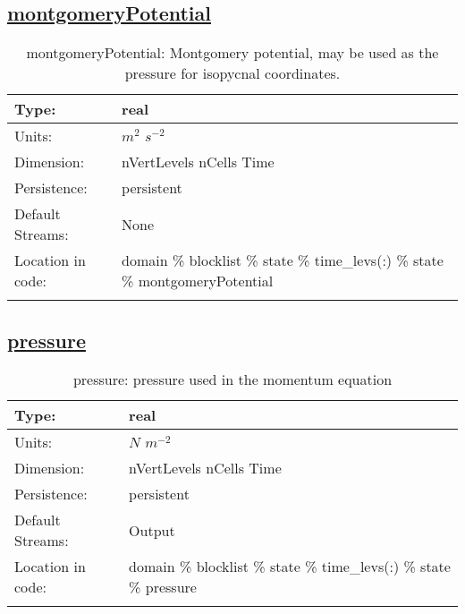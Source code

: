 \subsection[montgomeryPotential]{\hyperref[sec:var_tab_state]{montgomeryPotential}}
\label{subsec:var_sec_state_montgomeryPotential}
\begin{center}
\begin{longtable}{| p{2.0in} | p{4.0in} |}
        \hline 
        Type: & real \\
        \hline 
        Units: & $m^2$ $s^{-2}$ \\
        \hline 
        Dimension: & nVertLevels nCells Time \\
        \hline 
        Persistence: & persistent \\
        \hline 
		 Default Streams: & None \\
        \hline 
		 Location in code: & domain \% blocklist \% state \% time\_levs(:) \% state \% montgomeryPotential \\
		 \hline 
    \caption{montgomeryPotential: Montgomery potential, may be used as the pressure for isopycnal coordinates.}
\end{longtable}
\end{center}
\subsection[pressure]{\hyperref[sec:var_tab_state]{pressure}}
\label{subsec:var_sec_state_pressure}
\begin{center}
\begin{longtable}{| p{2.0in} | p{4.0in} |}
        \hline 
        Type: & real \\
        \hline 
        Units: & $N$ $m^{-2}$ \\
        \hline 
        Dimension: & nVertLevels nCells Time \\
        \hline 
        Persistence: & persistent \\
        \hline 
		 Default Streams: & Output  \\
        \hline 
		 Location in code: & domain \% blocklist \% state \% time\_levs(:) \% state \% pressure \\
		 \hline 
    \caption{pressure: pressure used in the momentum equation}
\end{longtable}
\end{center}
